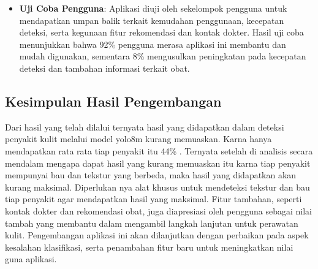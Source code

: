 \documentclass[journal,article,submit,pdftex,moreauthors]{Definitions/mdpi}
\begin{document}
\begin{itemize}
\begin{itemize}
    \end{itemize}

    \vspace{10pt}
    
    \item \textbf{Uji Coba Pengguna}:
    Aplikasi diuji oleh sekelompok pengguna untuk mendapatkan umpan balik terkait kemudahan penggunaan, kecepatan deteksi, serta kegunaan fitur rekomendasi dan kontak dokter. Hasil uji coba menunjukkan bahwa 92\% pengguna merasa aplikasi ini membantu dan mudah digunakan, sementara 8\% mengusulkan peningkatan pada kecepatan deteksi dan tambahan informasi terkait obat.
\end{itemize}


\subsection{Kesimpulan Hasil Pengembangan}

Dari hasil yang telah dilalui ternyata hasil yang didapatkan dalam deteksi penyakit kulit melalui model yolo8m kurang memuaskan. Karna hanya mendapatkan rata rata tiap penyakit itu 44\% . Ternyata setelah di analisis secara mendalam mengapa dapat hasil yang kurang memuaskan itu karna tiap penyakit mempunyai bau dan tekstur yang berbeda, maka hasil yang didapatkan akan kurang maksimal. Diperlukan nya alat khusus untuk mendeteksi tekstur dan bau tiap penyakit agar mendapatkan hasil yang maksimal. Fitur tambahan, seperti kontak dokter dan rekomendasi obat, juga diapresiasi oleh pengguna sebagai nilai tambah yang membantu dalam mengambil langkah lanjutan untuk perawatan kulit. Pengembangan aplikasi ini akan dilanjutkan dengan perbaikan pada aspek kesalahan klasifikasi, serta penambahan fitur baru untuk meningkatkan nilai guna aplikasi.
\end{document}
